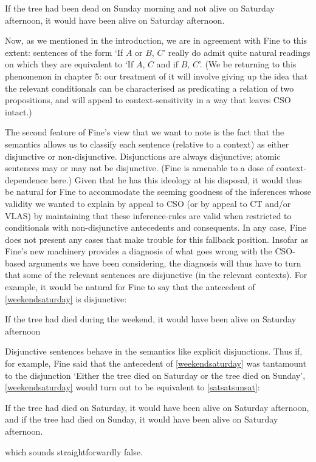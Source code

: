 \documentclass[If.tex]{subfiles}
\begin{document}
\begin{prop}
	\nitem \label{bad}
		If the tree had been dead on Sunday morning and not alive on Saturday afternoon, it would have been alive on Saturday afternoon.
\end{prop}
Now, as we mentioned in the introduction, we are in agreement with Fine to this extent: sentences of the form ‘If $A$ or $B$, $C$’ really do admit quite natural readings on which they are equivalent to ‘If $A$, $C$ and if $B$, $C$’. (We be returning to this phenomenon in chapter 5: our treatment of it will involve giving up the idea that the relevant conditionals can be characterised as predicating a relation of two propositions, and will appeal to context-sensitivity in a way that leaves CSO intact.)


The second feature of Fine's view that we want to note is the fact that the semantics allows us to classify each sentence (relative to a context) as either disjunctive or non-disjunctive. Disjunctions are always disjunctive; atomic sentences may or may not be disjunctive. (Fine is amenable to a dose of context-dependence here.) Given that he has this ideology at his disposal, it would thus be natural for Fine to accommodate the seeming goodness of the inferences whose validity we wanted to explain by appeal to CSO (or by appeal to CT and/or VLAS) by maintaining that these inference-rules are valid when restricted to conditionals with non-disjunctive antecedents and consequents. In any case, Fine does not present any cases that make trouble for this fallback position. Insofar as Fine's new machinery provides a diagnosis of what goes wrong with the CSO-based arguments we have been considering, the diagnosis will thus have to turn that some of the relevant sentences are disjunctive (in the relevant contexts). For example, it would be natural for Fine to say that the antecedent of \ref{weekendsaturday} is disjunctive:
\begin{prop}
	\sitem[\ref*{weekendsaturday}]
		If the tree had died during the weekend, it would have been alive on Saturday afternoon
\end{prop}
Disjunctive sentences behave in the semantics like explicit disjunctions. Thus if, for example, Fine said that the antecedent of \ref{weekendsaturday} was tantamount to the disjunction ‘Either the tree died on Saturday or the tree died on Sunday’, \ref{weekendsaturday} would turn out to be equivalent to \ref{satsatsunsat}:
\begin{prop}
	\nitem \label{satsatsunsat}
		If the tree had died on Saturday, it would have been alive on Saturday afternoon, and if the tree had died on Sunday, it would have been alive on Saturday afternoon.
\end{prop}
which sounds straightforwardly false.
\end{document}
